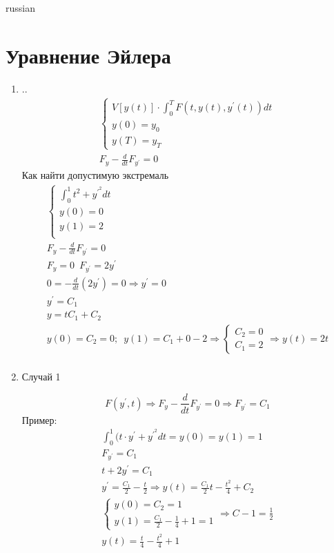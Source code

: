 \documentclass{article}
\begin{document}
\begin{otherlanguage*}{russian}
\section{\foreignlanguage{russian}{Уравнение Эйлера}}
\begin{enumerate}
\item .. 
\begin{align}
\begin{cases}
V [y(t)] \cdot \int_0^T F(t, y(t), y^{'} (t) ) dt \\
y(0) = y_0 \\
y(T) = y_T  
\end{cases} \\
F_y - \frac{d}{dt} F_{y^{'}} = 0 
\end{align}
Как найти допустимую экстремаль 
\begin{align}
\begin{cases}
\int_0^1 t^2 + y^{'^{2}} dt \\
y(0) =0 \\
y(1) = 2 \\
\end{cases} \\
F_y - \frac{d}{dt} F_{y^{'}} = 0 \\
F_y = 0 \,\,\, F_{y^{'}} = 2 y^{'} \\
0 = - \frac{d}{dt} (2 y ^{'}) = 0 \Rightarrow y^{'} = 0 \\
y^{'} = C_1 \\
y = t C_1 + C_2 \\ 
y(0) = C_2 = 0; \,\,\, y(1) = C_1 + 0 - 2 \Rightarrow \begin{cases}
C_2 = 0 \\
C_1 = 2 
\end{cases} \Rightarrow y(t) = 2 t \\
\end{align}
\item Случай 1 

\begin{equation}
F(y^{'}, t) \Rightarrow F_y - \frac{d}{dt} F_{y^{'}} = 0 \Rightarrow F_{y^{'}} = C_1 
\end{equation}
Пример: 
\begin{align}
\int_0^1 (t \cdot y ^{'} + y ^{'^{2}} dt = y(0) = y(1) = 1 \\
F_{y^{'}} = C_1 \\
t + 2y^{'} = C_1  \\
y^{'} = \frac{C_1}{2} - \frac{t}{2} \Rightarrow y(t) = \frac{C_1}{2} t - \frac{t^2}{4} + C_2 \\
\begin{cases}
y(0) = C_2 = 1 \\
y(1) = \frac{C_1}{2} - \frac{1}{4} + 1 = 1
\end{cases} \Rightarrow C-1 = \frac{1}{2} \\
y(t) = \frac{t}{4} - \frac{t^2}{4} + 1
\end{align}


\end{enumerate}
\end{otherlanguage*}
\end{document}
